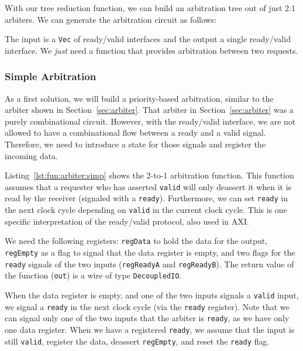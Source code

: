 \documentclass[%
    10pt,
    headinclude, footexclude,
    openright, %
    notitlepage,
    cleardoubleempty,
    headsepline,
    pointlessnumbers,
    bibtotoc, idxtotoc,
    ]{scrbook}
\newcommand{\code}[1]{{\lstinline[basicstyle=\small\ttfamily]{#1}}}
\begin{document}
With our tree reduction function, we can build an arbitration tree out of just 2:1 arbiters.
We can generate the arbitration circuit as follows:


\noindent The input is a \code{Vec} of ready/valid interfaces and the output a single ready/valid
interface. We \emph{just} need a function that provides arbitration between two requests.



\subsubsection{Simple Arbitration}

As a first solution, we will build a priority-based arbitration, similar to the arbiter shown
in Section~\ref{sec:arbiter}. That arbiter in Section~\ref{sec:arbiter} was a purely combinational circuit.
However, with the ready/valid interface, we are not allowed to have a combinational
flow between a ready and a valid signal. Therefore, we need to introduce a state for those signals
and register the incoming data.

Listing~\ref{lst:fun:arbiter:simp} shows the 2-to-1 arbitration function. This function assumes
that a requester who has asserted \code{valid} will only deassert it when it is read by the receiver
(signaled with a \code{ready}). Furthermore, we can set \code{ready} in the next clock cycle
depending on \code{valid} in the current clock cycle.
This is one specific interpretation of the ready/valid protocol, also used in AXI.


We need the following registers: \code{regData} to hold the data for the output, \code{regEmpty} as a  flag to
signal that the data register is empty, and two flags for the \code{ready} signals of the two inputs
(\code{regReadyA} and \code{regReadyB}).
The return value of the function (\code{out}) is a wire of type \code{DecoupledIO}.

When the data register is empty, and one of the two inputs signals a \code{valid} input,
we signal a \code{ready} in the next clock cycle (via the \code{ready} register).
Note that we can signal only one of the two inputs that the arbiter is \code{ready},
as we have only one data register.
When we have a registered \code{ready}, we assume that the input is still \code{valid},
register the data, deassert \code{regEmpty}, and reset the \code{ready} flag.
\end{document}
